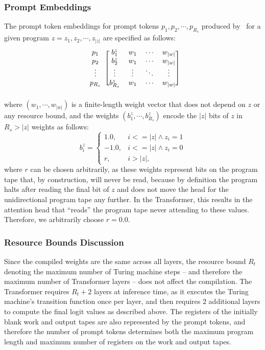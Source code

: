 \subsubsection{Prompt Embeddings}
\label{sec:prompt-embeddings}

The prompt token embeddings for prompt tokens $p_1, p_2, \cdots, p_{R_s}$ produced by \zmap~for a given program $z = z_1, z_2, \cdots, z_{|z|}$ are specified as follows:
\begin{equation}
  \begin{blockarray}{ccccc}
    \begin{block}{c[cccc]}
      p_1 & b^z_1 & w_1 & \cdots & w_{|w|}  \\
      p_2 & b^z_2 & w_1 & \cdots & w_{|w|}   \\
       \vdots & \vdots & \vdots & \ddots & \vdots   \\
      p_{R_s} & b^z_{R_s} & w_1 & \cdots & w_{|w|}   \\
    \end{block}
  \end{blockarray}
\end{equation}
where $(w_1, \cdots, w_{|w|})$ is a finite-length weight vector that does not depend on $z$ or any resource bound, and the weights $(b^z_1, \cdots, b^z_{R_s})$ encode the $|z|$ bits of $z$ in $R_s > |z|$ weights as follows:
\begin{equation}
b^z_i = \begin{cases}
1.0, & i <= |z| \land z_i = 1 \\
-1.0, & i <= |z| \land z_i = 0 \\
r, & i > |z|,
\end{cases}
\end{equation}
where $r$ can be chosen arbitrarily, as these weights represent bits on the program tape that, by construction, will never be read, because by definition the program halts after reading the final bit of $z$ and does not move the head for the unidirectional program tape any further. In the Transformer, this results in the attention head that ``reads'' the program tape never attending to these values. Therefore, we arbitrarily choose $r = 0.0$.

\subsubsection{Resource Bounds Discussion}
Since the compiled weights are the same across all layers, the resource bound $R_t$ denoting the maximum number of Turing machine steps -- and therefore the maximum number of Transformer layers -- does not affect the compilation. The Transformer requires $R_t + 2$ layers at inference time, as it executes the Turing machine's transition function once per layer, and then requires $2$ additional layers to compute the final logit values as described above.
The registers of the initially blank work and output tapes are also represented by the prompt tokens, and therefore the number of prompt tokens determines both the maximum program length and maximum number of registers on the work and output tapes.

